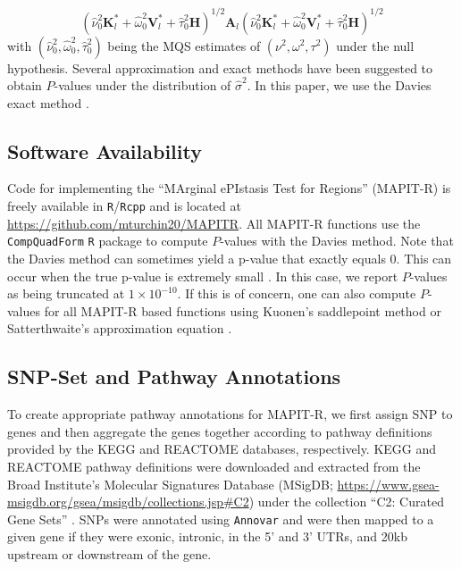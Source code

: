 \documentclass[10pt,a4paper]{article}
\newcommand{\bK}{\mathbf{K}}
\newcommand{\bV}{\mathbf{V}}
\newcommand{\bA}{\mathbf{A}}
\newcommand{\bH}{\mathbf{H}}
\newcommand{\wh}{\widehat}
\begin{document}
\begin{equation*}
\left(\wh\nu^2_{0}\bK^*_l+\wh\omega^2_{0}\bV^*_l+\wh\tau^2_{0}\bH\right)^{1/2}\bA_{l}\left(\wh\nu^2_{0}\bK^*_l+\wh\omega^2_{0}\bV^*_l+\wh\tau^2_{0}\bH\right)^{1/2} 
\end{equation*}
with $(\wh\nu^2_{0},\wh\omega^2_{0},\wh\tau^2_{0})$ being the MQS estimates of $(\nu^2,\omega^2,\tau^2)$ under the null hypothesis. Several approximation and exact methods have been suggested to obtain $P$-values under the distribution of $\wh\sigma^2$. In this paper, we use the Davies exact method \cite{Davies1980,Wu2011}. 

\subsection*{Software Availability}

Code for implementing the ``MArginal ePIstasis Test for Regions'' (MAPIT-R) is freely available in \texttt{R}/\texttt{Rcpp} and is located at \url{https://github.com/mturchin20/MAPITR}. All MAPIT-R functions use the \texttt{CompQuadForm} \texttt{R} package to compute $P$-values with the Davies method. Note that the Davies method can sometimes yield a p-value that exactly equals 0. This can occur when the true p-value is extremely small \cite{Chen:2013aa}. In this case, we report $P$-values as being truncated at $1\times10^{-10}$. If this is of concern, one can also compute $P$-values for all MAPIT-R based functions using Kuonen's saddlepoint method \cite{Chen:2013aa,Kuonen:1999aa} or Satterthwaite's approximation equation \cite{Satterthwaite:1946aa}.

\subsection*{SNP-Set and Pathway Annotations}

To create appropriate pathway annotations for MAPIT-R, we first assign SNP to genes and then aggregate the genes together according to pathway definitions provided by the KEGG and REACTOME databases, respectively. KEGG and REACTOME pathway definitions were downloaded and extracted from the Broad Institute's Molecular Signatures Database (MSigDB; \url{https://www.gsea-msigdb.org/gsea/msigdb/collections.jsp#C2}) under the collection ``C2: Curated Gene Sets'' \cite{Liberzon2011}. SNPs were annotated using \texttt{Annovar} \cite{Wang2010a} and were then mapped to a given gene if they were exonic, intronic, in the 5' and 3' UTRs, and 20kb upstream or downstream of the gene.
\end{document}
